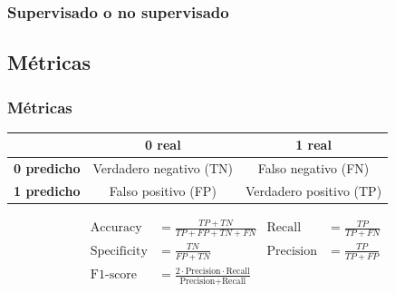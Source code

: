 \documentclass[10pt]{beamer}
\begin{document}
\begin{frame}
	\frametitle{Supervisado o no supervisado}
	\begin{figure}[htbp]
	\centering
	\qquad\quad
\end{figure}
\end{frame}

\subsection{M\'etricas}

\begin{frame}
	\frametitle{M\'etricas}
	\begin{table}[htbp]
		\centering
		\begin{tabular}{|c|c|c|}
			\hline
			& \textbf{0 real} & \textbf{1 real} \\
			\hline
			\textbf{0 predicho} & Verdadero negativo (TN) & Falso negativo (FN) \\
			\hline
			\textbf{1 predicho} & Falso positivo (FP) & Verdadero positivo (TP) \\
			\hline
		\end{tabular}
	\end{table}

	\begin{equation*}
		\begin{aligned}
			\text{Accuracy} &= \frac{TP + TN}{TP + FP + TN + FN} & \text{Recall} &= \frac{TP}{TP + FN} \\
			\text{Specificity} &= \frac{TN}{FP + TN} & \text{Precision} &= \frac{TP}{TP + FP} \\
			\text{F1-score} &= \frac{2\cdot \text{Precision}\cdot \text{Recall}}{\text{Precision} + \text{Recall}} & &
		\end{aligned}
	\end{equation*}
\end{frame}
\end{document}
